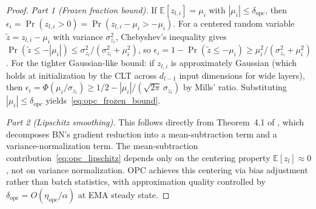 \documentclass{article}
\providecommand{\E}{\mathbb{E}}
\theoremstyle{plain}
\theoremstyle{definition}
\theoremstyle{remark}
\begin{document}
\begin{proof}
\emph{Part 1 (Frozen fraction bound).} If $\E[z_{l,i}] = \mu_i$ with $|\mu_i| \leq \delta_{\mathrm{opc}}$, then $\epsilon_i = \Pr(z_{l,i} > 0) = \Pr(z_{l,i} - \mu_i > -\mu_i)$. For a centered random variable $\tilde{z} = z_{l,i} - \mu_i$ with variance $\sigma_{z_i}^2$, Chebyshev's inequality gives $\Pr(\tilde{z} \leq -|\mu_i|) \leq \sigma_{z_i}^2/(\sigma_{z_i}^2 + \mu_i^2)$, so $\epsilon_i = 1 - \Pr(\tilde{z} \leq -\mu_i) \geq \mu_i^2/(\sigma_{z_i}^2 + \mu_i^2)$. For the tighter Gaussian-like bound: if $z_{l,i}$ is approximately Gaussian (which holds at initialization by the CLT across $d_{l-1}$ input dimensions for wide layers), then $\epsilon_i = \Phi(\mu_i/\sigma_{z_i}) \geq 1/2 - |\mu_i|/({\sqrt{2\pi}\,\sigma_{z_i}})$ by Mills' ratio. Substituting $|\mu_i| \leq \delta_{\mathrm{opc}}$ yields~\eqref{eq:opc_frozen_bound}.

\emph{Part 2 (Lipschitz smoothing).} This follows directly from Theorem~4.1 of \citet{santurkar2018does}, which decomposes BN's gradient reduction into a mean-subtraction term and a variance-normalization term. The mean-subtraction contribution~\eqref{eq:opc_lipschitz} depends only on the centering property $\E[z_l] \approx 0$, not on variance normalization. OPC achieves this centering via bias adjustment rather than batch statistics, with approximation quality controlled by $\delta_{\mathrm{opc}} = O(\eta_{\mathrm{opc}}/\alpha)$ at EMA steady state.
\end{proof}

\end{document}
